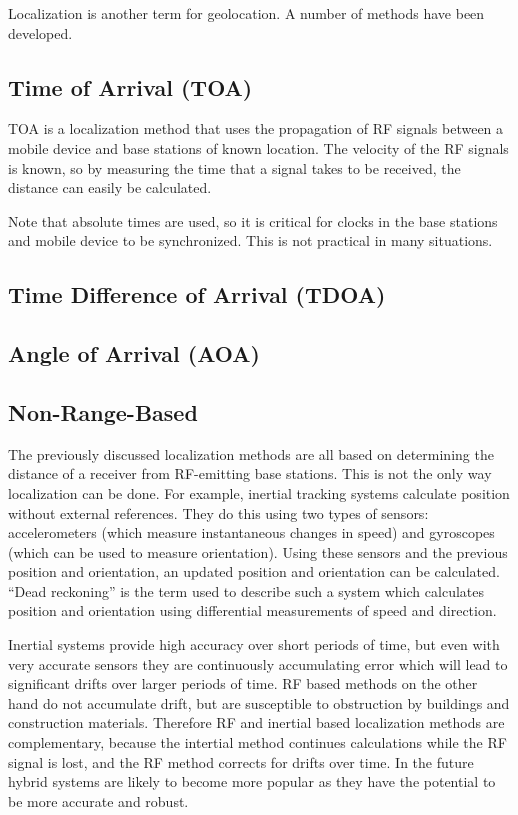 Localization is another term for geolocation. A number of methods have been developed.

\subsection{Time of Arrival (TOA)}

TOA is a localization method that uses the propagation of RF signals between a mobile device and base stations of known location. The velocity of the RF signals is known, so by measuring the time that a signal takes to be received, the distance can easily be calculated. 

Note that absolute times are used, so it is critical for clocks in the base stations and mobile device to be synchronized. This is not practical in many situations.

\subsection{Time Difference of Arrival (TDOA)}

\subsection{Angle of Arrival (AOA)}

\subsection{Non-Range-Based}

The previously discussed localization methods are all based on determining the distance of a receiver from RF-emitting base stations. This is not the only way localization can be done. For example, inertial tracking systems calculate position without external references. They do this using two types of sensors: accelerometers (which measure instantaneous changes in speed) and gyroscopes (which can be used to measure orientation). Using these sensors and the previous position and orientation, an updated position and orientation can be calculated. ``Dead reckoning'' is the term used to describe such a system which calculates position and orientation using differential measurements of speed and direction.

Inertial systems provide high accuracy over short periods of time, but even with very accurate sensors they are continuously accumulating error which will lead to significant drifts over larger periods of time. RF based methods on the other hand do not accumulate drift, but are susceptible to obstruction by buildings and construction materials. Therefore RF and inertial based localization methods are complementary, because the intertial method continues calculations while the RF signal is lost, and the RF method corrects for drifts over time. In the future hybrid systems are likely to become more popular as they have the potential to be more accurate and robust.

